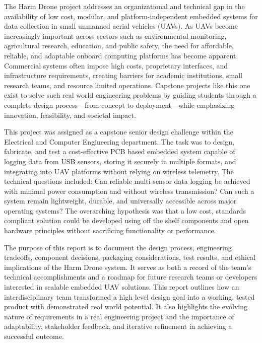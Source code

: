 \documentclass[12pt]{article}
\begin{document}
\par The Harm Drone project addresses an organizational and technical gap in the availability of low cost, modular, and platform-independent embedded systems for data collection in small unmanned aerial vehicles (UAVs). As UAVs become increasingly important across sectors such as environmental monitoring, agricultural research, education, and public safety, the need for affordable, reliable, and adaptable onboard computing platforms has become apparent. Commercial systems often impose high costs, proprietary interfaces, and infrastructure requirements, creating barriers for academic institutions, small research teams, and resource limited operations. Capstone projects like this one exist to solve such real world engineering problems by guiding students through a complete design process—from concept to deployment—while emphasizing innovation, feasibility, and societal impact.

\par This project was assigned as a capstone senior design challenge within the Electrical and Computer Engineering department. The task was to design, fabricate, and test a cost-effective PCB based embedded system capable of logging data from USB sensors, storing it securely in multiple formats, and integrating into UAV platforms without relying on wireless telemetry. The technical questions included: Can reliable multi sensor data logging be achieved with minimal power consumption and without wireless transmission? Can such a system remain lightweight, durable, and universally accessible across major operating systems? The overarching hypothesis was that a low cost, standards compliant solution could be developed using off the shelf components and open hardware principles without sacrificing functionality or performance.

\par The purpose of this report is to document the design process, engineering tradeoffs, component decisions, packaging considerations, test results, and ethical implications of the Harm Drone system. It serves as both a record of the team’s technical accomplishments and a roadmap for future research teams or developers interested in scalable embedded UAV solutions. This report outlines how an interdisciplinary team transformed a high level design goal into a working, tested product with demonstrated real world potential. It also highlights the evolving nature of requirements in a real engineering project and the importance of adaptability, stakeholder feedback, and iterative refinement in achieving a successful outcome.
\end{document}
